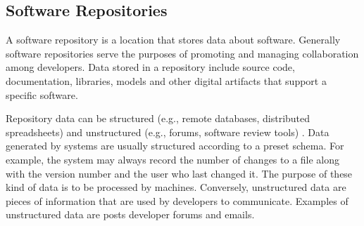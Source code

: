 %
%



\subsection{Software Repositories}



A software repository is a location that stores data about software. 
Generally software repositories serve the purposes of promoting and managing collaboration among developers. Data stored in a repository include source code, documentation, libraries, models and other digital artifacts that support a specific software. 

Repository data can be structured (e.g., remote databases, distributed spreadsheets) and unstructured (e.g., forums, software review tools) \citep{DBLP:books/el/16/Bacchelli16,DBLP:conf/wcre/Bavota16}. Data generated by systems are usually structured according to a preset schema. For example, the system may always record the number of changes to a file along with the version number and the user who last changed it. The purpose of these kind of data is to be processed by machines. Conversely, unstructured data are pieces of information that are used by developers to communicate. Examples of unstructured data are posts developer forums and emails. 

